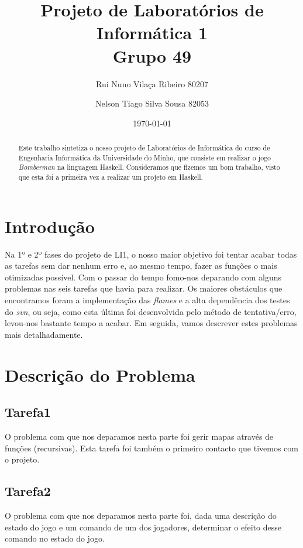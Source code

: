 \documentclass[a4paper]{report}
\title{Projeto de Laboratórios de Informática 1\\Grupo 49}
\author{Rui Nuno Vilaça Ribeiro 80207 \and Nelson Tiago Silva Sousa 82053}
\date{\today}
\begin{document}
\maketitle

\begin{abstract}
  Este trabalho sintetiza o nosso projeto de Laboratórios de Informática do curso de Engenharia Informática da Universidade do Minho, que consiste em realizar o jogo \emph{Bomberman} na linguagem Haskell.
  Consideramos que fizemos um bom trabalho, visto que esta foi a primeira vez a realizar um projeto em Haskell.
\end{abstract}

\tableofcontents

\section{Introdução}
\label{intro} 

 Na 1º e 2º fases do projeto de LI1, o nosso maior objetivo foi tentar acabar todas as tarefas sem dar nenhum erro e, ao mesmo tempo, fazer as funções o mais otimizadas possível. Com o passar do tempo fomo-nos deparando com alguns problemas nas seis tarefas que havia para realizar. 
 Os maiores obstáculos que encontramos foram a implementação das \emph{flames} e a alta dependência dos testes do \emph{svn}, ou seja, como esta última foi desenvolvida pelo método de tentativa/erro, levou-nos bastante tempo a acabar. 
 Em seguida, vamos descrever estes problemas mais detalhadamente. 

\section{Descrição do Problema}
\label{sec:problema}

\subsection{Tarefa1}

O problema com que nos deparamos nesta parte foi gerir mapas através de funções (recursivas). Esta tarefa foi também o primeiro contacto que tivemos com o projeto.

\subsection{Tarefa2}

O problema com que nos deparamos nesta parte foi, dada uma descrição do estado do jogo e um comando de um dos jogadores, determinar o efeito desse comando no estado do jogo.
\end{document}
